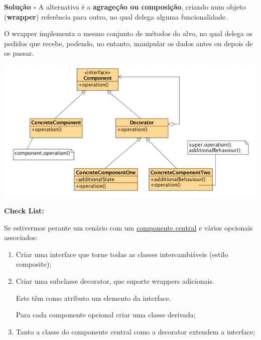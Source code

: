 \documentclass{article}
\begin{document}
\begin{flushleft}
    \textbf{Solução -} A alternativa é a \textbf{agrageção ou composição}, criando num objeto (\textbf{wrapper})
    referência para outro, no qual delega alguma funcionalidade.

    O wrapper implementa o mesmo conjunto de métodos do alvo, no qual delega os
    pedidos que recebe, podendo, no entanto, manipular os dados antes ou depois de os
    passar.

    \begin{center}
        \includegraphics[scale=0.4]{Images/47.png}
    \end{center}
\end{flushleft}

\begin{flushleft}
    \textbf{Check List:}

    \vspace{3mm}
    Se estivermos perante um cenário com um \uline{componente central} e vários opcionais
    associados:
    \begin{enumerate}
        \item Criar uma interface que torne todas as classes intercambiáveis (estilo
        composite);
        \item Criar uma subclasse decorator, que suporte wrappers adicionais.
        
        Este têm como atributo um elemento da interface.
        
        Para cada componente opcional criar uma classe derivada;

        \item Tanto a classe do componente central como a decorator extendem a
        interface;
    \end{enumerate}
\end{flushleft}

\pagebreak
\end{document}
